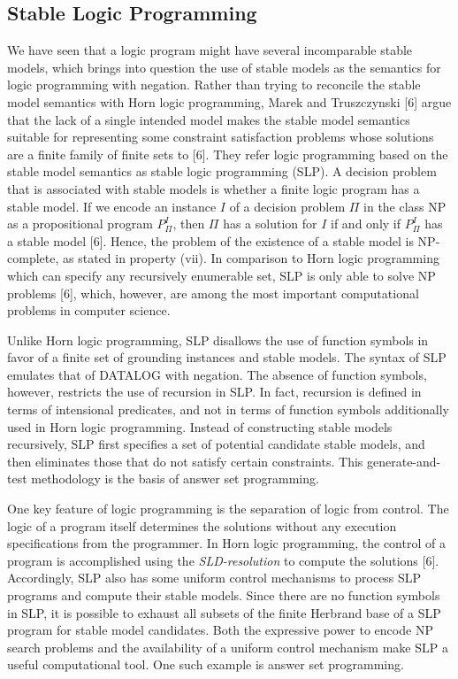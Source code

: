 \subsection{Stable Logic Programming} 
We have seen that a logic program might have several incomparable stable models, 
which brings into question the use of stable models as the semantics for 
logic programming with negation. Rather 
than trying to reconcile the stable model semantics with Horn logic programming, 
Marek and Truszczynski [6] argue that the lack of a single intended model 
makes the stable model semantics suitable for representing 
some constraint satisfaction problems whose solutions 
are a finite family of finite sets to [6]. 
They refer logic programming based on the stable model semantics  
as stable logic programming (SLP). A decision problem that is associated with 
stable models is whether a finite logic program has a stable model. If we 
encode an instance $I$ of a decision problem $\Pi$ in the class NP as a propositional program 
$P ^I _ \Pi$, then $\Pi$ has a solution for $I$ if and only if $P ^I _ \Pi$ 
has a stable model [6]. Hence, the problem of the existence of a stable model is 
NP-complete, as stated in property (vii). In comparison to Horn logic programming 
which can specify any recursively enumerable set, SLP is only able 
to solve NP problems [6], which, however, are among the most important computational 
problems in computer science.

Unlike Horn logic programming, SLP disallows the use of function symbols in favor of 
a finite set of grounding instances and stable models. The syntax of SLP emulates 
that of DATALOG with negation. The absence of function symbols, however, restricts the 
use of recursion in SLP. In fact, recursion is defined in terms of intensional predicates, 
and not in terms of function symbols additionally used in Horn logic programming. Instead 
of constructing stable models recursively, SLP first specifies a set of potential candidate 
stable models, and then eliminates those that do not satisfy certain constraints. This 
generate-and-test methodology is the basis of answer set programming. 

One key feature of logic programming is the separation of logic from control. The logic 
of a program itself determines the solutions without any execution specifications from 
the programmer. In Horn logic programming, the control of a program is accomplished 
using the \textit{SLD-resolution} to compute the solutions [6]. Accordingly, SLP also 
has some uniform control mechanisms to process SLP programs and compute their stable models. 
Since there are no function symbols in SLP, it is possible to exhaust all subsets of the 
finite Herbrand base of a SLP program for stable model candidates. Both the 
expressive power to encode NP search problems and the availability of 
a uniform control mechanism make SLP a useful computational tool. One such example is answer set 
programming.

